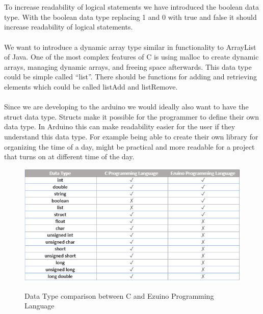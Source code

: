 \\\\
To increase readability of logical statements we have introduced the boolean data type. With the boolean data type replacing 1 and 0 with true and false it should increase readability of logical statements.
\\ \\
We want to introduce a dynamic array type similar in functionality to ArrayList of Java. One of the most complex features of C is using malloc to create dynamic arrays, managing dynamic arrays, and freeing space afterwards. This data type could be simple called “list”. There should be functions for adding and retrieving elements which could be called listAdd and listRemove.
\\ \\
Since we are developing to the arduino we would ideally also want to have the struct data type. Structs make it possible for the programmer to define their own data type. In Arduino this can make readability easier for the user if they understand this data type. For example being able to create their own library for organizing the time of a day, might be practical and more readable for a project that turns on at different time of the day.  
\begin{figure}[H]
\centering
\caption{Data Type comparison between C and Ezuino Programming Language}
\includegraphics[scale=0.85]{figures/language_features/langf01.png}
\label{lf01}
\end{figure}
